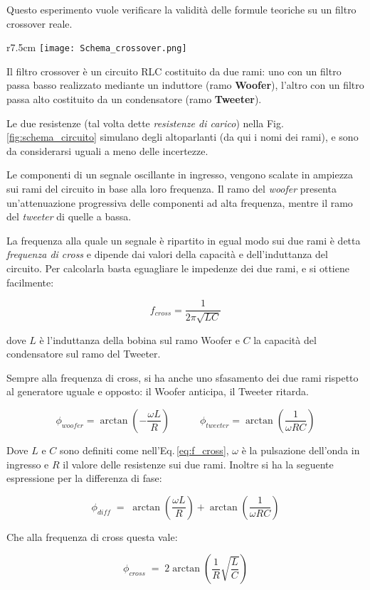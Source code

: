 \documentclass[../Relazione_circuiti]{subfiles}
\begin{document}
Questo esperimento vuole verificare la validità delle formule teoriche su un filtro crossover reale.

\begin{wrapfigure}{r}{7.5cm}
  \centering
  \texttt{[image: Schema\_crossover.png]}
  \caption{Schema del circuito realizzato}
  \label{fig:schema_circuito}
\end{wrapfigure}

Il filtro crossover è un circuito RLC costituito da due rami: uno con un filtro passa basso realizzato mediante un
induttore (ramo \textbf{Woofer}), l'altro con un filtro passa alto costituito da un condensatore (ramo
\textbf{Tweeter}).

Le due resistenze (tal volta dette \textit{resistenze di carico}) nella Fig.\,\ref{fig:schema_circuito} simulano degli
altoparlanti (da qui i nomi dei rami), e sono da considerarsi uguali a meno delle incertezze.

Le componenti di un segnale oscillante in ingresso, vengono scalate in ampiezza sui rami del circuito in base alla loro
frequenza.
Il ramo del \textit{woofer} presenta un'attenuazione progressiva delle componenti ad alta frequenza, mentre il ramo
del \textit{tweeter} di quelle a bassa.

La frequenza alla quale un segnale è ripartito in egual modo sui due rami è detta \textit{frequenza di cross} e dipende
dai valori della capacità e dell'induttanza del circuito.
Per calcolarla basta eguagliare le impedenze dei due rami, e si ottiene facilmente:

\begin{equation}
  \label{eq:f_cross}
  f_{cross} = \frac{1}{2 \pi \sqrt{LC} }
\end{equation}

dove $L$ è l'induttanza della bobina sul ramo Woofer e $C$ la capacità del condensatore sul ramo del Tweeter.

Sempre alla frequenza di cross, si ha anche uno sfasamento dei due rami rispetto al generatore uguale e opposto: il
Woofer anticipa, il Tweeter ritarda.

\begin{equation*}
  \phi_{woofer} = \arctan(-\frac{\omega L}{R}) \qquad \quad %
  \phi_{tweeter} = \arctan(\frac{1}{\omega RC}) %
\end{equation*}

Dove $L$ e $C$ sono definiti come nell'Eq.\,\eqref{eq:f_cross}, $\omega$ è la pulsazione dell'onda in ingresso e $R$ il
valore delle resistenze sui due rami.
Inoltre si ha la seguente espressione per la differenza di fase:

\begin{equation}
  \label{eq:p_diff}
  \phi_{diff} \; = \; \arctan(\frac{\omega L}{R}) + \arctan(\frac{1}{\omega RC})
\end{equation}

Che alla frequenza di cross questa vale:

\begin{equation}
  \label{eq:p_diff_cross}
  \phi_{cross} \; = \; 2 \arctan(\frac{1}{R} \sqrt{\frac{L}{C}})
\end{equation}
\end{document}
